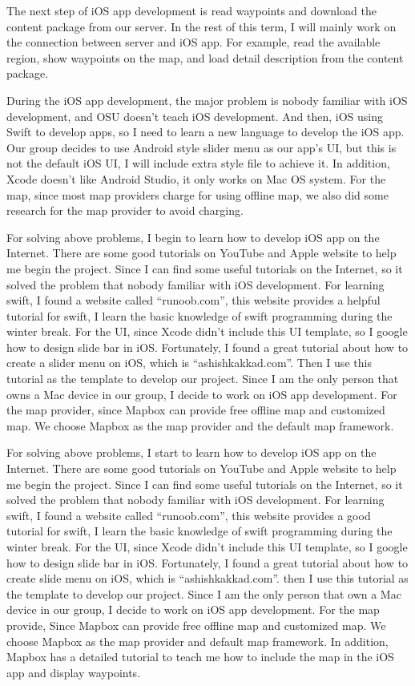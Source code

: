 \documentclass[letterpaper, 10pt,titlepage]{article}
\begin{document}
The next step of iOS app development is read waypoints and download the content package from our server. In the rest of this term, I will mainly work on the connection between server and iOS app. For example, read the available region, show waypoints on the map, and load detail description from the content package.
 
During the iOS app development, the major problem is nobody familiar with iOS development, and OSU doesn’t teach iOS development. And then, iOS using Swift to develop apps, so I need to learn a new language to develop the iOS app. Our group decides to use Android style slider menu as our app’s UI, but this is not the default iOS UI, I will include extra style file to achieve it. In addition, Xcode doesn’t like Android Studio, it only works on Mac OS system. For the map, since most map providers charge for using offline map, we also did some research for the map provider to avoid charging.
 
For solving above problems, I begin to learn how to develop iOS app on the Internet. There are some good tutorials on YouTube and Apple website to help me begin the project. Since I can find some useful tutorials on the Internet, so it solved the problem that nobody familiar with iOS development. For learning swift, I found a website called “runoob.com”, this website provides a helpful tutorial for swift, I learn the basic knowledge of swift programming during the winter break. For the UI, since Xcode didn’t include this UI template, so I google how to design slide bar in iOS. Fortunately, I found a great tutorial about how to create a slider menu on iOS, which is “ashishkakkad.com”. Then I use this tutorial as the template to develop our project. Since I am the only person that owns a Mac device in our group, I decide to work on iOS app development. For the map provider, since Mapbox can provide free offline map and customized map. We choose Mapbox as the map provider and the default map framework.
 
For solving above problems, I start to learn how to develop iOS app on the Internet. There are some good tutorials on YouTube and Apple website to help me begin the project. Since I can find some useful tutorials on the Internet, so it solved the problem that nobody familiar with iOS development. For learning swift, I found a website called “runoob.com”, this website provides a good tutorial for swift, I learn the basic knowledge of swift programming during the winter break. For the UI, since Xcode didn’t include this UI template, so I google how to design slide bar in iOS. Fortunately, I found a great tutorial about how to create slide menu on iOS, which is “ashishkakkad.com”. then I use this tutorial as the template to develop our project. Since I am the only person that own a Mac device in our group, I decide to work on iOS app development. For the map provide, Since Mapbox can provide free offline map and customized map. We choose Mapbox as the map provider and default map framework. In addition, Mapbox has a detailed tutorial to teach me how to include the map in the iOS app and display waypoints.
\end{document}
